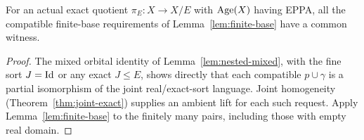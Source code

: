 \begin{corollary}\label{cor:fixed-base}
For an actual exact quotient $\pi_E:X\to X/E$ with
$\operatorname{Age}(X)$ having EPPA, all the compatible finite-base
requirements of Lemma~\ref{lem:finite-base} have a common witness.
\end{corollary}
\begin{proof}
The mixed orbital identity of Lemma~\ref{lem:nested-mixed},
with the fine sort $J=\mathrm{Id}$ or any exact $J\le E$, shows directly
that each compatible $p\cup\gamma$ is a partial isomorphism
of the joint real/exact-sort language. Joint homogeneity
(Theorem~\ref{thm:joint-exact}) supplies an ambient lift for each
such request. Apply Lemma~\ref{lem:finite-base} to the finitely
many pairs, including those with empty real domain.
\end{proof}

